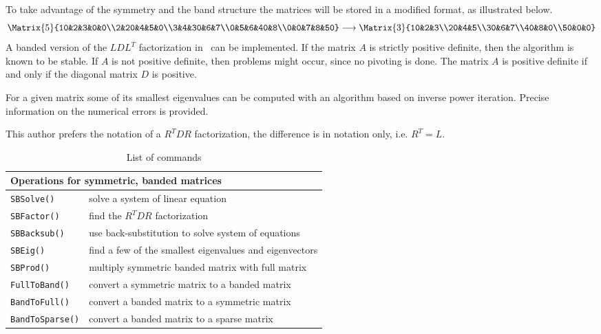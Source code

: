 \documentclass[11pt]{article}
\begin{document}
To take advantage of the symmetry and the band structure the matrices will
be stored in a modified format, as illustrated below.
\[\Matrix{5}{10&2&3&0&0\\2&20&4&5&0\\3&4&30&6&7\\0&5&6&40&8\\0&0&7&8&50}
\longrightarrow
\Matrix{3}{10&2&3\\20&4&5\\30&6&7\\40&8&0\\50&0&0}\]
A banded version of the $LDL^T$ factorization in~\cite{GoluVanLoan96}
can be implemented. If the matrix $A$ is strictly positive definite, then
the algorithm is known to be stable. If $A$ is not positive definite, then
problems might occur, since no pivoting is done. The matrix $A$ is
positive definite if and only if the diagonal matrix $D$ is positive.

For a given matrix some of its smallest eigenvalues can be computed with an
algorithm based on inverse power iteration. Precise information on the
numerical errors is provided.

This author prefers the notation of a $R^TDR$ factorization, the
difference is in notation only, i.e. $R^T=L$. 

\begin{table}[htbp]
  \begin{center}
\begin{tabular}{|l|l|}\hline
\multicolumn{2}{|l|}{Operations for symmetric, banded matrices}\\\hline
\texttt{SBSolve()} & solve a system of linear equation \\
\texttt{SBFactor()} & find the $R^TDR$ factorization \\
\texttt{SBBacksub()} & use back-substitution to solve system of equations\\
\texttt{SBEig()} & find a few of the smallest eigenvalues and eigenvectors\\
\texttt{SBProd()} & multiply symmetric banded matrix with full matrix\\
\texttt{FullToBand()} & convert a symmetric matrix to a banded matrix\\
\texttt{BandToFull()} & convert a banded matrix to a symmetric matrix\\
\texttt{BandToSparse()} & convert a banded matrix to a sparse matrix\\
\hline\end{tabular}
    \caption{List of commands}
    \label{tab:commands}
  \end{center}
\end{table}
\begin{center}
\end{center}
\end{document}
